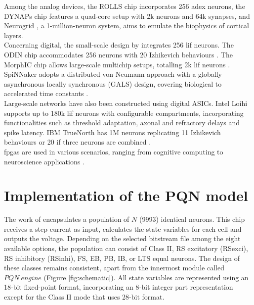 Among the analog devices, the ROLLS chip \cite{Qiao} 
incorporates 256 \acrshort{adex} neurons, the DYNAPs 
chip \cite{Moradi} features a quad-core setup with 2k 
neurons and 64k synapses, and Neurogrid 
\cite{Benjamin}, a 1-million-neuron system, aims to 
emulate the biophysics of cortical layers.\\
Concerning digital, the small-scale design by 
\cite{Seo} integrates 256 \acrshort{lif} neurons. The 
ODIN chip accommodates 256 neurons with 20 Izhikevich behaviours \cite{FrenkelOdin}. 
The MorphIC chip allows 
large-scale multichip setups, totalling 2k 
\acrshort{lif} neurons \cite{FrenkelMorphic}. 
SpiNNaker adopts a distributed von Neumann approach 
with a globally asynchronous locally synchronous 
(GALS) design, covering biological to accelerated time 
constants \cite{Painkras}.\\
Large-scale networks have also been constructed using digital ASICs.  
Intel Loihi \cite{Davies} supports up to 180k \acrshort{lif} neurons 
with configurable compartments, incorporating functionalities such as 
threshold adaptation, axonal and refractory delays and spike latency.
IBM TrueNorth \cite{Merolla} has 1M neurons replicating 11 Izhikevich 
behaviours or 20 if three neurons are combined \cite{Cassidy2013}.\\
\acrshort{fpga}s are used in various scenarios, ranging from cognitive 
computing \cite{Thomas,Cassidy2011,Li2012,Neil} to neuroscience applications 
\cite{Luo,Khoyratee,Yang}.\\

\section{Implementation of the PQN model}
\label{section:PQNimpl}

The work of \cite{Nanami} encapsulates a population of $N$ (9993) 
identical neurons. This chip receives a step current as input, 
calculates the state variables for each cell and outputs the voltage. 
Depending on the selected bitstream file among the eight available options, 
the population can consist of Class II, RS excitatory (RSexci), 
RS inhibitory (RSinhi), FS, EB, PB, IB, or LTS equal neurons. 
The design of these classes remains consistent, apart from the innermost 
module called $PQN\ engine$ (Figure \ref{fig:schematic}). 
All state variables are represented using an 18-bit fixed-point format, 
incorporating an 8-bit integer part representation except for the Class II 
mode that uses 28-bit format.\\

